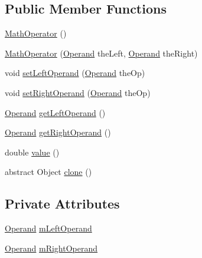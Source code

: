 \subsection*{Public Member Functions}
\begin{DoxyCompactItemize}
\item 
\hyperlink{classexamples_1_1math_1_1cmd_1_1_math_operator_a907ee142e11f8eea9c0d57b91c1fb92a}{Math\-Operator} ()
\item 
\hyperlink{classexamples_1_1math_1_1cmd_1_1_math_operator_a9ee6ed8525fbb89310d53012fadad1a3}{Math\-Operator} (\hyperlink{interfaceexamples_1_1math_1_1cmd_1_1_operand}{Operand} the\-Left, \hyperlink{interfaceexamples_1_1math_1_1cmd_1_1_operand}{Operand} the\-Right)
\item 
void \hyperlink{classexamples_1_1math_1_1cmd_1_1_math_operator_a4f04b5ed11a6bb29ca51609c2b2f2f8a}{set\-Left\-Operand} (\hyperlink{interfaceexamples_1_1math_1_1cmd_1_1_operand}{Operand} the\-Op)
\item 
void \hyperlink{classexamples_1_1math_1_1cmd_1_1_math_operator_a54cee6904f650c9e6fde5fc8aa20daad}{set\-Right\-Operand} (\hyperlink{interfaceexamples_1_1math_1_1cmd_1_1_operand}{Operand} the\-Op)
\item 
\hyperlink{interfaceexamples_1_1math_1_1cmd_1_1_operand}{Operand} \hyperlink{classexamples_1_1math_1_1cmd_1_1_math_operator_a82444ae785a3f0ac0097130acd7d432c}{get\-Left\-Operand} ()
\item 
\hyperlink{interfaceexamples_1_1math_1_1cmd_1_1_operand}{Operand} \hyperlink{classexamples_1_1math_1_1cmd_1_1_math_operator_af9f13db06baf29ab594a4fd6df0efea9}{get\-Right\-Operand} ()
\item 
double \hyperlink{classexamples_1_1math_1_1cmd_1_1_math_operator_a94d1b7d6b6d29c8cad4518a44011a493}{value} ()
\item 
abstract Object \hyperlink{classexamples_1_1math_1_1cmd_1_1_math_operator_a06b476ba62c4b892c2689943a8beed81}{clone} ()
\end{DoxyCompactItemize}
\subsection*{Private Attributes}
\begin{DoxyCompactItemize}
\item 
\hyperlink{interfaceexamples_1_1math_1_1cmd_1_1_operand}{Operand} \hyperlink{classexamples_1_1math_1_1cmd_1_1_math_operator_ad6d25295790c86cf6d8bb5fb92efff68}{m\-Left\-Operand}
\item 
\hyperlink{interfaceexamples_1_1math_1_1cmd_1_1_operand}{Operand} \hyperlink{classexamples_1_1math_1_1cmd_1_1_math_operator_ac903d7a31eade46a6015321bfd34bb1c}{m\-Right\-Operand}
\end{DoxyCompactItemize}
